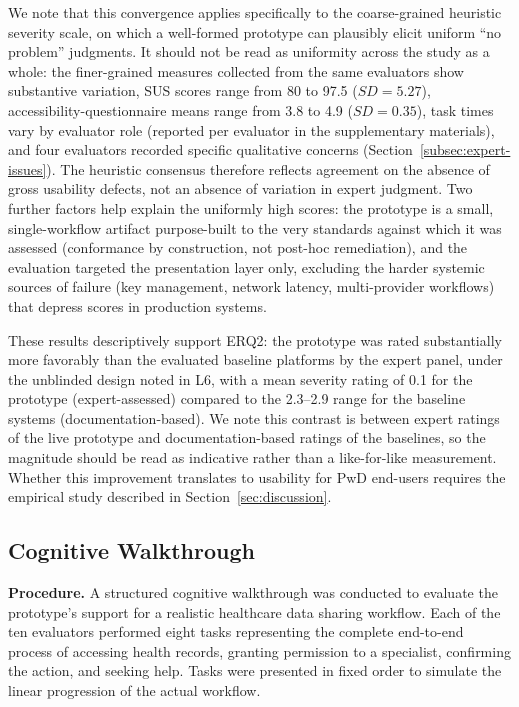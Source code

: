 \documentclass[journal,onecolumn]{IEEEtran}
\begin{document}
We note that this convergence applies specifically to the coarse-grained heuristic severity scale, on which a well-formed prototype can plausibly elicit uniform ``no problem'' judgments. It should not be read as uniformity across the study as a whole: the finer-grained measures collected from the same evaluators show substantive variation, SUS scores range from 80 to 97.5 ($SD = 5.27$), accessibility-questionnaire means range from 3.8 to 4.9 ($SD = 0.35$), task times vary by evaluator role (reported per evaluator in the supplementary materials), and four evaluators recorded specific qualitative concerns (Section~\ref{subsec:expert-issues}). The heuristic consensus therefore reflects agreement on the absence of gross usability defects, not an absence of variation in expert judgment. Two further factors help explain the uniformly high scores: the prototype is a small, single-workflow artifact purpose-built to the very standards against which it was assessed (conformance by construction, not post-hoc remediation), and the evaluation targeted the presentation layer only, excluding the harder systemic sources of failure (key management, network latency, multi-provider workflows) that depress scores in production systems.

These results descriptively support ERQ2: the prototype was rated substantially more favorably than the evaluated baseline platforms by the expert panel, under the unblinded design noted in L6, with a mean severity rating of 0.1 for the prototype (expert-assessed) compared to the 2.3--2.9 range for the baseline systems (documentation-based). We note this contrast is between expert ratings of the live prototype and documentation-based ratings of the baselines, so the magnitude should be read as indicative rather than a like-for-like measurement. Whether this improvement translates to usability for PwD end-users requires the empirical study described in Section~\ref{sec:discussion}.

\subsection{Cognitive Walkthrough}
\label{subsec:cognitive-walkthrough}

\noindent\textbf{Procedure.} 
A structured cognitive walkthrough was conducted to evaluate the
prototype's support for a realistic healthcare data sharing workflow.
Each of the ten evaluators performed eight tasks representing the
complete end-to-end process of accessing health records, granting
permission to a specialist, confirming the action, and seeking help.
Tasks were presented in fixed order to simulate the linear progression
of the actual workflow.
\end{document}
